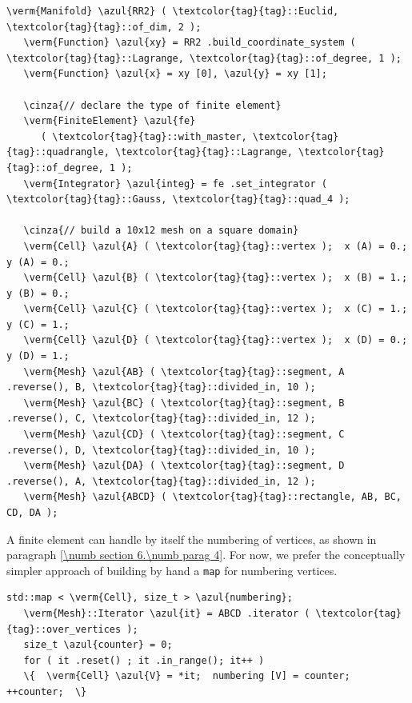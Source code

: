 \begin{Verbatim}[commandchars=\\\{\},formatcom=\small\tt,frame=single,
   label=parag-\ref{\numb section 6.\numb parag 2}.cpp,rulecolor=\color{moldura},
   baselinestretch=0.94,framesep=2mm                                            ]
   \verm{Manifold} \azul{RR2} ( \textcolor{tag}{tag}::Euclid, \textcolor{tag}{tag}::of_dim, 2 );
   \verm{Function} \azul{xy} = RR2 .build_coordinate_system ( \textcolor{tag}{tag}::Lagrange, \textcolor{tag}{tag}::of_degree, 1 );
   \verm{Function} \azul{x} = xy [0], \azul{y} = xy [1];

   \cinza{// declare the type of finite element}
   \verm{FiniteElement} \azul{fe}
      ( \textcolor{tag}{tag}::with_master, \textcolor{tag}{tag}::quadrangle, \textcolor{tag}{tag}::Lagrange, \textcolor{tag}{tag}::of_degree, 1 );
   \verm{Integrator} \azul{integ} = fe .set_integrator ( \textcolor{tag}{tag}::Gauss, \textcolor{tag}{tag}::quad_4 );

   \cinza{// build a 10x12 mesh on a square domain}
   \verm{Cell} \azul{A} ( \textcolor{tag}{tag}::vertex );  x (A) = 0.;   y (A) = 0.;
   \verm{Cell} \azul{B} ( \textcolor{tag}{tag}::vertex );  x (B) = 1.;   y (B) = 0.;
   \verm{Cell} \azul{C} ( \textcolor{tag}{tag}::vertex );  x (C) = 1.;   y (C) = 1.;
   \verm{Cell} \azul{D} ( \textcolor{tag}{tag}::vertex );  x (D) = 0.;   y (D) = 1.;
   \verm{Mesh} \azul{AB} ( \textcolor{tag}{tag}::segment, A .reverse(), B, \textcolor{tag}{tag}::divided_in, 10 );
   \verm{Mesh} \azul{BC} ( \textcolor{tag}{tag}::segment, B .reverse(), C, \textcolor{tag}{tag}::divided_in, 12 );
   \verm{Mesh} \azul{CD} ( \textcolor{tag}{tag}::segment, C .reverse(), D, \textcolor{tag}{tag}::divided_in, 10 );
   \verm{Mesh} \azul{DA} ( \textcolor{tag}{tag}::segment, D .reverse(), A, \textcolor{tag}{tag}::divided_in, 12 );
   \verm{Mesh} \azul{ABCD} ( \textcolor{tag}{tag}::rectangle, AB, BC, CD, DA );
\end{Verbatim}

A finite element can handle by itself the numbering of vertices, as shown in paragraph
\ref{\numb section 6.\numb parag 4}.
For now, we prefer the conceptually simpler approach of building by hand a {\small\tt map}
for numbering vertices.

\begin{Verbatim}[commandchars=\\\{\},formatcom=\small\tt,frame=single,
   label=parag-\ref{\numb section 6.\numb parag 2}.cpp,rulecolor=\color{moldura},
   baselinestretch=0.94,framesep=2mm                                            ]
   std::map < \verm{Cell}, size_t > \azul{numbering};
   \verm{Mesh}::Iterator \azul{it} = ABCD .iterator ( \textcolor{tag}{tag}::over_vertices );
   size_t \azul{counter} = 0;
   for ( it .reset() ; it .in_range(); it++ )
   \{  \verm{Cell} \azul{V} = *it;  numbering [V] = counter;  ++counter;  \}
\end{Verbatim}

